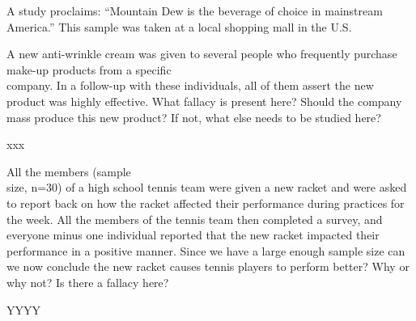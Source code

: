 \documentclass[11pt, chapterprefix=true]{scrbook}\usepackage[]{graphicx}\usepackage[]{color}
\begin{document}
\begin{exercises}
\begin{exercise}

  \end{exercise}
  \begin{solution}  %

  A study proclaims: ``Mountain Dew is the beverage of choice in mainstream America.''  This sample was taken at a local shopping mall in the U.S.
  \end{solution}

\begin{exercise}  %

A new anti-wrinkle cream was given to several people who frequently purchase make-up products from a specific \\ company.  In a follow-up with these individuals, all of them assert the new product was highly effective.  What fallacy is present here?  Should the company mass produce this new product? If not, what else needs to be studied here?

\end{exercise}
\begin{solution}  %

xxx

\end{solution}

\begin{exercise}  %

All the members (sample \\ size, n=30) of a high school tennis team were given a new racket and were asked to report back on how the racket affected their performance during practices for the week.  All the members of the tennis team then completed a survey, and everyone minus one individual reported that the new racket impacted their performance in a positive manner.  Since we have a large enough sample size can we now conclude the new racket causes tennis players to perform better?  Why or why not?  Is there a fallacy here?

	\end{exercise}
	 \begin{solution}  %

	   YYYY
	 \end{solution}

\end{exercises}

\onecolumn



\end{document}
